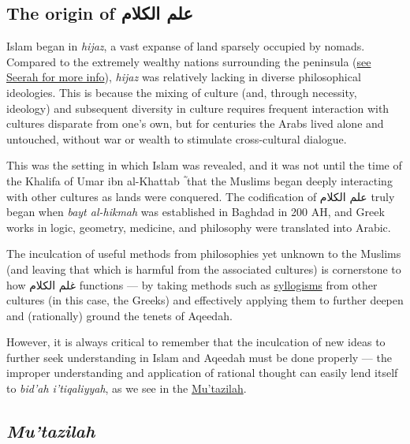 \documentclass[]{book}
\begin{document}
\hypertarget{the-origin-of-ux639ux644ux645-ux627ux644ux643ux644ux627ux645}{%
\subsection{The origin of علم الكلام}\label{the-origin-of-ux639ux644ux645-ux627ux644ux643ux644ux627ux645}}

Islam began in \emph{hijaz}, a vast expanse of land sparsely occupied by nomads. Compared to the extremely wealthy nations surrounding the peninsula (\protect\hyperlink{seerah}{see Seerah for more info}), \emph{hijaz} was relatively lacking in diverse philosophical ideologies. This is because the mixing of culture (and, through necessity, ideology) and subsequent diversity in culture requires frequent interaction with cultures disparate from one's own, but for centuries the Arabs lived alone and untouched, without war or wealth to stimulate cross-cultural dialogue.

This was the setting in which Islam was revealed, and it was not until the time of the Khalifa of Umar ibn al-Khattab ؓ that the Muslims began deeply interacting with other cultures as lands were conquered. The codification of علم الكلام truly began when \emph{bayt al-hikmah} was established in Baghdad in 200 AH, and Greek works in logic, geometry, medicine, and philosophy were translated into Arabic.

The inculcation of useful methods from philosophies yet unknown to the Muslims (and leaving that which is harmful from the associated cultures) is cornerstone to how غلم الكلام functions --- by taking methods such as \protect\hyperlink{syllogism}{syllogisms} from other cultures (in this case, the Greeks) and effectively applying them to further deepen and (rationally) ground the tenets of Aqeedah.

However, it is always critical to remember that the inculcation of new ideas to further seek understanding in Islam and Aqeedah must be done properly --- the improper understanding and application of rational thought can easily lend itself to \emph{bid'ah i'tiqaliyyah}, as we see in the \protect\hyperlink{mutazilah}{Mu'tazilah}.

\hypertarget{mutazilah}{%
\subsection{\texorpdfstring{\emph{Mu'tazilah}}{Mu'tazilah}}\label{mutazilah}}
\end{document}
